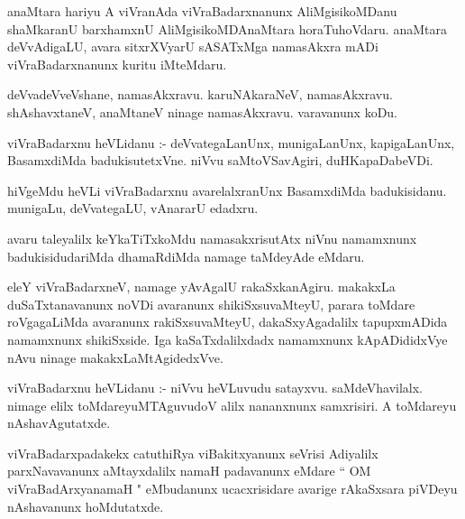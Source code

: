 \documentclass{article}
\begin{document}
\begin{mn}
anaMtara  hariyu  A  viVranAda  viVraBadarxnanunx  AliMgisikoMDanu  shaMkaranU  barxhamxnU  AliMgisikoMDAnaMtara  horaTuhoVdaru.  
anaMtara  deVvAdigaLU,  avara  sitxrXVyarU  sASATxMga  namasAkxra  mADi  viVraBadarxnanunx  kuritu  iMteMdaru.
\end{mn}

\begin{mn}
deVvadeVveVshane,  namasAkxravu.  karuNAkaraNeV,  namasAkxravu.  shAshavxtaneV,  anaMtaneV  ninage  namasAkxravu.  varavanunx  koDu.
\end{mn}

\begin{mn}
viVraBadarxnu  heVLidanu :- deVvategaLanUnx,  munigaLanUnx,  kapigaLanUnx,  BasamxdiMda  badukisutetxVne.  niVvu  
saMtoVSavAgiri,  duHKapaDabeVDi.
\end{mn}

\begin{mn}
hiVgeMdu  heVLi  viVraBadarxnu  avarelalxranUnx  BasamxdiMda  badukisidanu.  munigaLu,  deVvategaLU,  vAnararU  edadxru.
\end{mn}

\begin{mn}
avaru  taleyalilx  keYkaTiTxkoMdu  namasakxrisutAtx  niVnu  namamxnunx  badukisidudariMda  dhamaRdiMda  namage  taMdeyAde  eMdaru.
\end{mn}

\begin{mn}
eleY  viVraBadarxneV,  namage  yAvAgalU  rakaSxkanAgiru.  makakxLa  duSaTxtanavanunx  noVDi  avaranunx  shikiSxsuvaMteyU,  
parara  toMdare  roVgagaLiMda  avaranunx  rakiSxsuvaMteyU,  dakaSxyAgadalilx  tapupxmADida  namamxnunx  shikiSxside.  Iga  
kaSaTxdalilxdadx  namamxnunx  kApADididxVye  nAvu  ninage  makakxLaMtAgidedxVve.
\end{mn}

\begin{mn}
viVraBadarxnu  heVLidanu :- niVvu  heVLuvudu  satayxvu.  saMdeVhavilalx.  nimage  elilx  toMdareyuMTAguvudoV  alilx  nananxnunx  
samxrisiri.  A  toMdareyu  nAshavAgutatxde.
\end{mn}

\begin{mn}
viVraBadarxpadakekx  catuthiRya  viBakitxyanunx  seVrisi  Adiyalilx  parxNavavanunx  aMtayxdalilx  namaH  padavanunx  
eMdare  `` OM  viVraBadArxyanamaH "  eMbudanunx  ucacxrisidare  avarige  rAkaSxsara  piVDeyu  nAshavanunx  hoMdutatxde.
\end{mn}
\end{document}
